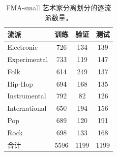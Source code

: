 \begin{table}[H]
\centering\small
\caption{FMA-small 艺术家分离划分的逐流派数量。}
\label{tab:fmasplit}
\begin{tabular}{lccc}
\toprule
流派 & 训练 & 验证 & 测试\\
\midrule
Electronic & 726 & 134 & 139\\
Experimental & 733 & 119 & 147\\
Folk & 614 & 249 & 137\\
Hip-Hop & 694 & 168 & 135\\
Instrumental & 792 & 82 & 126\\
International & 650 & 194 & 156\\
Pop & 689 & 120 & 191\\
Rock & 698 & 133 & 168\\
合计 & 5596 & 1199 & 1199\\
\bottomrule
\end{tabular}
\end{table}
